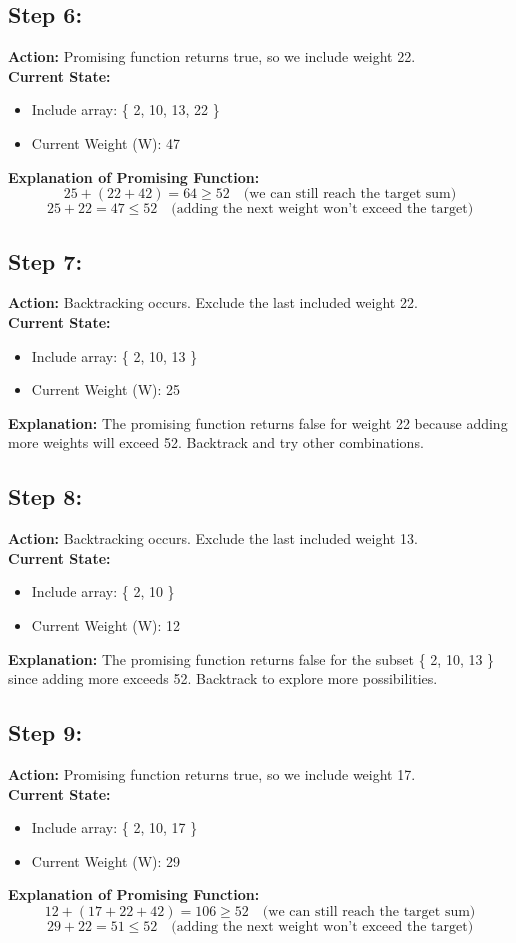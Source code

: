 \documentclass[12pt]{article}
\begin{document}
\subsection*{Step 6:}
\textbf{Action:} Promising function returns true, so we include weight 22. \\
\textbf{Current State:} 
\begin{itemize}
    \item Include array: \{ 2, 10, 13, 22 \}
    \item Current Weight (W): 47
\end{itemize}
\textbf{Explanation of Promising Function:}
\[
25 + (22 + 42) = 64 \geq 52 \quad \text{(we can still reach the target sum)}
\]
\[
25 + 22 = 47 \leq 52 \quad \text{(adding the next weight won't exceed the target)}
\]

\subsection*{Step 7:}
\textbf{Action:} Backtracking occurs. Exclude the last included weight 22. \\
\textbf{Current State:} 
\begin{itemize}
    \item Include array: \{ 2, 10, 13 \}
    \item Current Weight (W): 25
\end{itemize}
\textbf{Explanation:} The promising function returns false for weight 22 because adding more weights will exceed 52. Backtrack and try other combinations.

\subsection*{Step 8:}
\textbf{Action:} Backtracking occurs. Exclude the last included weight 13. \\
\textbf{Current State:} 
\begin{itemize}
    \item Include array: \{ 2, 10 \}
    \item Current Weight (W): 12
\end{itemize}
\textbf{Explanation:} The promising function returns false for the subset \{ 2, 10, 13 \} since adding more exceeds 52. Backtrack to explore more possibilities.

\subsection*{Step 9:}
\textbf{Action:} Promising function returns true, so we include weight 17. \\
\textbf{Current State:} 
\begin{itemize}
    \item Include array: \{ 2, 10, 17 \}
    \item Current Weight (W): 29
\end{itemize}
\textbf{Explanation of Promising Function:}
\[
12 + (17 + 22 + 42) = 106 \geq 52 \quad \text{(we can still reach the target sum)}
\]
\[
29 + 22 = 51 \leq 52 \quad \text{(adding the next weight won't exceed the target)}
\]
\end{document}
